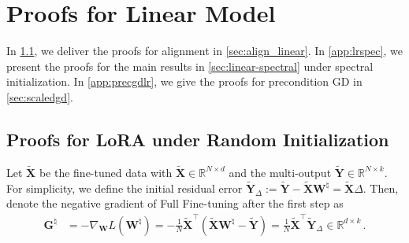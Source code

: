 \newpage
\section{Proofs for Linear Model}
\label{lora_linear}


In \cref{app:align_linear}, we deliver the proofs for alignment in \cref{sec:align_linear}.
In \cref{app:lrspec}, we present the proofs for the main results in \cref{sec:linear-spectral} under spectral initialization.
In \cref{app:precgdlr}, we give the proofs for precondition GD in \cref{sec:scaledgd}.

\subsection{Proofs for LoRA under Random Initialization}
\label{app:align_linear}

Let $\widetilde{\bm X}$ be the fine-tuned data with $\widetilde{\bm X} \in \mathbb{R}^{N \times d}$ and the multi-output $\widetilde{\bm Y} \in \mathbb{R}^{N \times k}$.
For simplicity, we define the initial residual error $\widetilde{\bm Y}_{\Delta} := \widetilde{\bm Y} - \widetilde{\bm X}\bm W^\natural = \widetilde{\bm X}\Delta$. Then, denote the negative gradient of Full Fine-tuning after the first step as
\begin{align*}
  {\bm G}^{\natural} & = -\nabla_{\bm W} {L}(\bm W^\natural) = -\frac{1}{N}\widetilde{\bm X}^{\!\top}(\widetilde{\bm X}\bm W^\natural-\widetilde{\bm Y}) = \frac{1}{N}\widetilde{\bm X}^{\!\top}\widetilde{\bm Y}_{\Delta} \in \mathbb{R}^{d \times k}\, .
\end{align*}

